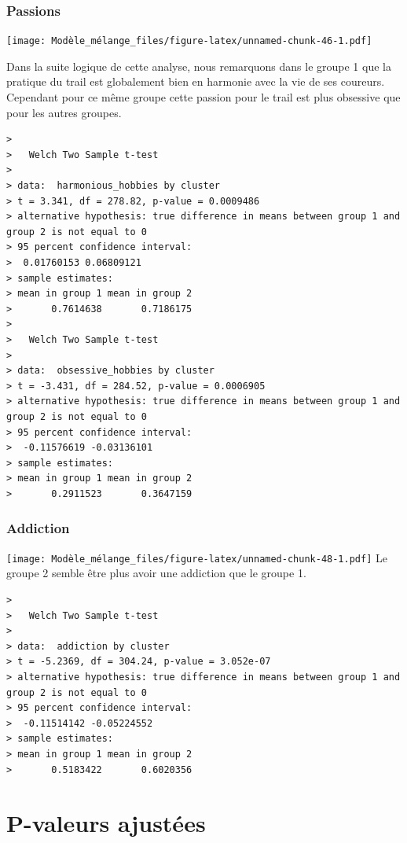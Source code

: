 \documentclass[
]{article}
\begin{document}
\hypertarget{passions}{%
\subsubsection{Passions}\label{passions}}

\texttt{[image: Modèle\_mélange\_files/figure-latex/unnamed-chunk-46-1.pdf]}

Dans la suite logique de cette analyse, nous remarquons dans le groupe 1
que la pratique du trail est globalement bien en harmonie avec la vie de
ses coureurs. Cependant pour ce même groupe cette passion pour le trail
est plus obsessive que pour les autres groupes.

\begin{verbatim}
> 
>   Welch Two Sample t-test
> 
> data:  harmonious_hobbies by cluster
> t = 3.341, df = 278.82, p-value = 0.0009486
> alternative hypothesis: true difference in means between group 1 and group 2 is not equal to 0
> 95 percent confidence interval:
>  0.01760153 0.06809121
> sample estimates:
> mean in group 1 mean in group 2 
>       0.7614638       0.7186175
> 
>   Welch Two Sample t-test
> 
> data:  obsessive_hobbies by cluster
> t = -3.431, df = 284.52, p-value = 0.0006905
> alternative hypothesis: true difference in means between group 1 and group 2 is not equal to 0
> 95 percent confidence interval:
>  -0.11576619 -0.03136101
> sample estimates:
> mean in group 1 mean in group 2 
>       0.2911523       0.3647159
\end{verbatim}

\hypertarget{addiction}{%
\subsubsection{Addiction}\label{addiction}}

\texttt{[image: Modèle\_mélange\_files/figure-latex/unnamed-chunk-48-1.pdf]}
Le groupe 2 semble être plus avoir une addiction que le groupe 1.

\begin{verbatim}
> 
>   Welch Two Sample t-test
> 
> data:  addiction by cluster
> t = -5.2369, df = 304.24, p-value = 3.052e-07
> alternative hypothesis: true difference in means between group 1 and group 2 is not equal to 0
> 95 percent confidence interval:
>  -0.11514142 -0.05224552
> sample estimates:
> mean in group 1 mean in group 2 
>       0.5183422       0.6020356
\end{verbatim}

\newpage

\hypertarget{p-valeurs-ajustuxe9es}{%
\section{P-valeurs ajustées}\label{p-valeurs-ajustuxe9es}}
\end{document}

